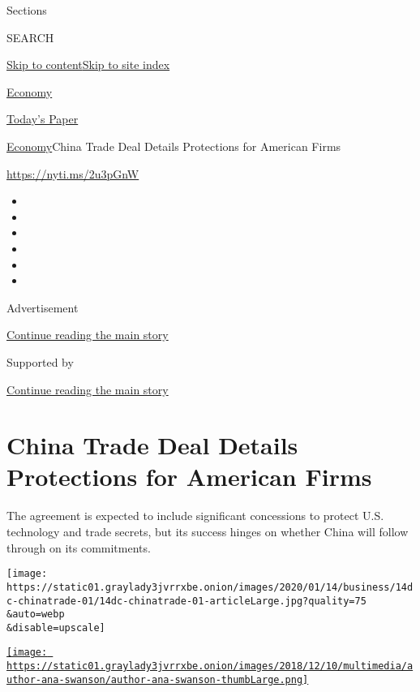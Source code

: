 Sections

SEARCH

\protect\hyperlink{site-content}{Skip to
content}\protect\hyperlink{site-index}{Skip to site index}

\href{https://www.nytimes3xbfgragh.onion/section/business/economy}{Economy}

\href{https://myaccount.nytimes3xbfgragh.onion/auth/login?response_type=cookie\&client_id=vi}{}

\href{https://www.nytimes3xbfgragh.onion/section/todayspaper}{Today's
Paper}

\href{/section/business/economy}{Economy}\textbar{}China Trade Deal
Details Protections for American Firms

\url{https://nyti.ms/2u3pGnW}

\begin{itemize}
\item
\item
\item
\item
\item
\item
\end{itemize}

Advertisement

\protect\hyperlink{after-top}{Continue reading the main story}

Supported by

\protect\hyperlink{after-sponsor}{Continue reading the main story}

\hypertarget{china-trade-deal-details-protections-for-american-firms}{%
\section{China Trade Deal Details Protections for American
Firms}\label{china-trade-deal-details-protections-for-american-firms}}

The agreement is expected to include significant concessions to protect
U.S. technology and trade secrets, but its success hinges on whether
China will follow through on its commitments.

\texttt{[image: https://static01.graylady3jvrrxbe.onion/images/2020/01/14/business/14dc-chinatrade-01/14dc-chinatrade-01-articleLarge.jpg?quality=75\\\&auto=webp\\\&disable=upscale]}

\href{https://www.nytimes3xbfgragh.onion/by/ana-swanson}{\texttt{[image: https://static01.graylady3jvrrxbe.onion/images/2018/12/10/multimedia/author-ana-swanson/author-ana-swanson-thumbLarge.png]}}

